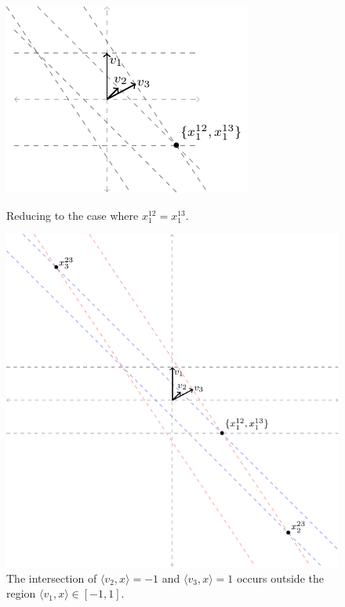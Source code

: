 \documentclass[final]{colt2020} %
\newcommand{\inprod}[2]{\langle #1, #2 \rangle}%
\begin{document}
\begin{figure}
		\begin{minipage}{0.4\linewidth}
		\centering
		\includegraphics[width=0.9\linewidth]{tikz/qp-intuition-contradiction.pdf}
		\caption{Reducing to the case where $x^{12}_1 = x^{13}_1$.}
		\label{fig:qp-line-intersect-contradiction}
	\end{minipage}
\hfill
	\begin{minipage}{0.59\linewidth}
	\centering
	\includegraphics[width=0.9\linewidth]{tikz/qp-intuition-contradiction-with-intersection.pdf}
	\caption{The intersection of $\inprod{v_2}{x} = -1$ and $\inprod{v_3}{x} = 1$ occurs outside the region $\inprod{v_1}{x} \in [-1,1]$.}
	\label{fig:qp-line-intersect-contradiction-with-intersection}
	\end{minipage}
\end{figure}
\end{document}
